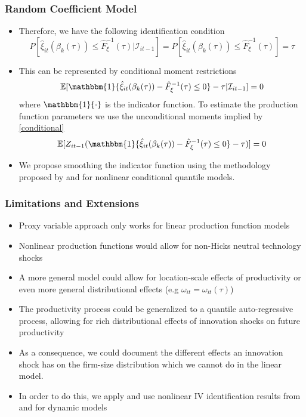 \documentclass{beamer}
\begin{document}
\begin{frame}
\frametitle{Random Coefficient Model}
\begin{itemize}
	\item Therefore, we have the following identification condition
		\begin{equation}
		P[\hat{\xi}_{it}(\beta_{k}(\tau))\leq \hat{F}_{\xi}^{-1}(\tau)|\mathcal{I}_{it-1}]=P[\hat{\xi}_{it}(\beta_{k}(\tau))\leq \hat{F}_{\xi}^{-1}(\tau)]=\tau
		\end{equation}
	\item This can be represented by conditional moment restrictions
		\begin{equation} \label{conditional}
			\mathbb{E}[\mathbbm{1}\{\hat{\xi}_{it}(\beta_{k}(\tau))- \hat{F}_{\xi}^{-1}(\tau)\leq 0\}-\tau|\mathcal{I}_{it-1}]=0
		\end{equation}
		where $\mathbbm{1}\{\cdot\}$ is the indicator function. To estimate the production function parameters we use the unconditional moments implied by \eqref{conditional}
		\begin{equation}
			\mathbb{E}[Z_{it-1}(\mathbbm{1}\{\hat{\xi}_{it}(\beta_{k}(\tau))- \hat{F}_{\xi}^{-1}(\tau)\leq 0\}-\tau)]=0
		\end{equation}
		\item We propose smoothing the indicator function using the methodology proposed by \cite{Kaplan2016} and \cite{qgmm}  for nonlinear conditional quantile models.
\end{itemize}
\end{frame}


\begin{frame}
\frametitle{Limitations and Extensions}
\begin{itemize}
	\item Proxy variable approach only works for linear production function models
	\item Nonlinear production functions would allow for non-Hicks neutral technology shocks
	\item A more general model could allow for location-scale effects of productivity or even more general distributional effects (e.g $\omega_{it}=\omega_{it}(\tau)$)
	\item The productivity process could be generalized to a quantile auto-regressive process, allowing for rich distributional effects of innovation shocks on future productivity
	\item As a consequence, we could document the different effects an innovation shock has on the firm-size distribution which we cannot do in the linear model.
	\item In order to do this, we apply \cite{Arellano2016} and use nonlinear IV identification results from \cite{Hu2008} and \cite{Hu2012} for dynamic models
\end{itemize}
\end{frame}
\end{document}
